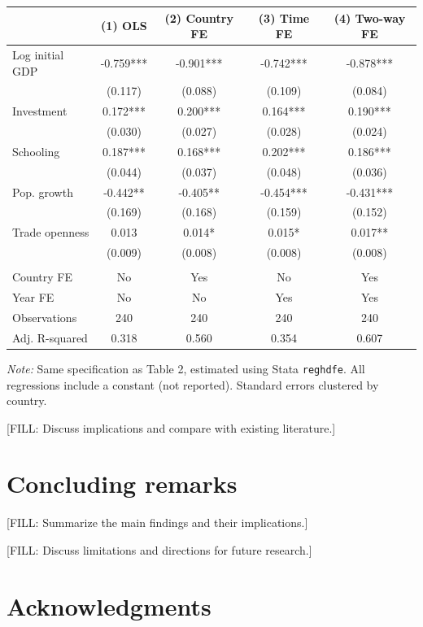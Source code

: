 \documentclass[
  letterpaper,
  DIV=11,
  numbers=noendperiod]{scrartcl}
\newcounter{none} %
\begin{document}
{\def\LTcaptype{none} %
\begin{longtable}[]{@{}lcccc@{}}
\toprule\noalign{}
& (1) OLS & (2) Country FE & (3) Time FE & (4) Two-way FE \\
\midrule\noalign{}
\endhead
\bottomrule\noalign{}
\endlastfoot
Log initial GDP & -0.759*** & -0.901*** & -0.742*** & -0.878*** \\
& (0.117) & (0.088) & (0.109) & (0.084) \\
Investment & 0.172*** & 0.200*** & 0.164*** & 0.190*** \\
& (0.030) & (0.027) & (0.028) & (0.024) \\
Schooling & 0.187*** & 0.168*** & 0.202*** & 0.186*** \\
& (0.044) & (0.037) & (0.048) & (0.036) \\
Pop. growth & -0.442** & -0.405** & -0.454*** & -0.431*** \\
& (0.169) & (0.168) & (0.159) & (0.152) \\
Trade openness & 0.013 & 0.014* & 0.015* & 0.017** \\
& (0.009) & (0.008) & (0.008) & (0.008) \\
& & & & \\
Country FE & No & Yes & No & Yes \\
Year FE & No & No & Yes & Yes \\
Observations & 240 & 240 & 240 & 240 \\
Adj. R-squared & 0.318 & 0.560 & 0.354 & 0.607 \\
\end{longtable}
}

\emph{Note:} Same specification as Table 2, estimated using Stata
\texttt{reghdfe}. All regressions include a constant (not reported).
Standard errors clustered by country.

{[}FILL: Discuss implications and compare with existing literature.{]}

\section{Concluding remarks}\label{sec-conclusion}

{[}FILL: Summarize the main findings and their implications.{]}

{[}FILL: Discuss limitations and directions for future research.{]}

\section{Acknowledgments}\label{acknowledgments}
\end{document}
